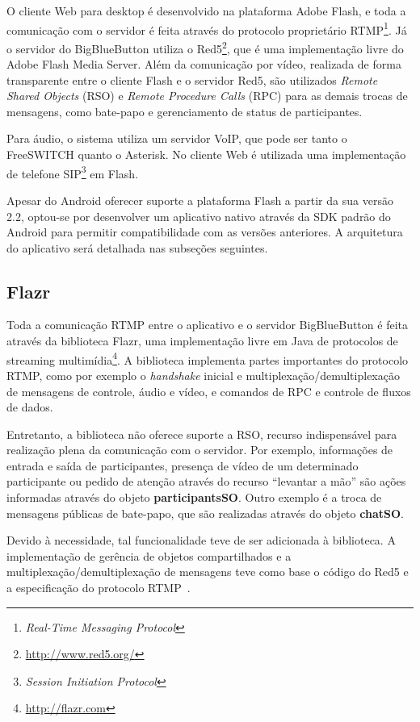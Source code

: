 \documentclass{acm_proc_article-sp}
\begin{document}
O cliente Web para desktop é desenvolvido na plataforma Adobe Flash, e toda a comunicação com o servidor é feita através do protocolo proprietário RTMP\footnote{\emph{Real-Time Messaging Protocol}}. Já o servidor do BigBlueButton utiliza o Red5\footnote{\url{http://www.red5.org/}}, que é uma implementação livre do Adobe Flash Media Server. Além da comunicação por vídeo, realizada de forma transparente entre o cliente Flash e o servidor Red5, são utilizados \emph{Remote Shared Objects} (RSO) e \emph{Remote Procedure Calls} (RPC) para as demais trocas de mensagens, como bate-papo e gerenciamento de status de participantes.

Para áudio, o sistema utiliza um servidor VoIP, que pode ser tanto o FreeSWITCH quanto o Asterisk. No cliente Web é utilizada uma implementação de telefone SIP\footnote{\emph{Session Initiation Protocol}} em Flash.

Apesar do Android oferecer suporte a plataforma Flash a partir da sua versão 2.2, optou-se por desenvolver um aplicativo nativo através da SDK padrão do Android para permitir compatibilidade com as versões anteriores. A arquitetura do aplicativo será detalhada nas subseções seguintes.

\subsection{Flazr}

Toda a comunicação RTMP entre o aplicativo e o servidor BigBlueButton é feita através da biblioteca Flazr, uma implementação livre em Java de protocolos de streaming multimídia\footnote{\url{http://flazr.com}}. A biblioteca implementa partes importantes do protocolo RTMP, como por exemplo o \emph{handshake} inicial e multiplexação/demultiplexação de mensagens de controle, áudio e vídeo, e comandos de RPC e controle de fluxos de dados.

Entretanto, a biblioteca não oferece suporte a RSO, recurso indispensável para realização plena da comunicação com o servidor. Por exemplo, informações de entrada e saída de participantes, presença de vídeo de um determinado participante ou pedido de atenção através do recurso ``levantar a mão'' são ações informadas através do objeto \textbf{participantsSO}. Outro exemplo é a troca de mensagens públicas de bate-papo, que são realizadas através do objeto \textbf{chatSO}. 

Devido à necessidade, tal funcionalidade teve de ser adicionada à biblioteca. A implementação de gerência de objetos compartilhados e a multiplexação/demultiplexação de mensagens teve como base o código do Red5 e a especificação do protocolo RTMP~\cite{rtmp}.
\end{document}
